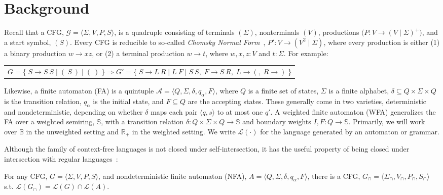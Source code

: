 \documentclass[popl.tex]{subfiles}
\begin{document}
\section{Background}

Recall that a CFG, $\mathcal{G} = \langle \Sigma, V, P, S\rangle$, is a quadruple consisting of terminals $(\Sigma)$, nonterminals $(V)$, productions $\big(P\colon V \rightarrow (V \mid \Sigma)^+\big)$, and a start symbol, $(S)$. Every CFG is reducible to so-called \textit{Chomsky Normal Form}~\cite{chomsky1959certain}, $P'\colon V \rightarrow (V^2 \mid \Sigma)$, where every production is either (1) a binary production $w \rightarrow xz$, or (2) a terminal production $w \rightarrow t$, where $w, x, z: V$ and $t: \Sigma$. For example:\vspace{-3pt}

\begin{table}[H]
  \centering
  \begin{tabular}{l}
    $G = \big\{\;S \rightarrow S\:S \mid (\:S\:) \mid (\:)\;\big\} \Longrightarrow G' = \big\{\;S \rightarrow L\:R \mid L\:F \mid S\:S,\;F \rightarrow S\:R,\;L \rightarrow (,\;R \rightarrow )\;\big\}$
  \end{tabular}
\end{table}\vspace{-8pt}

Likewise, a finite automaton (FA) is a quintuple $\mathcal{A} = \langle Q, \Sigma, \delta, q_\alpha, F\rangle$, where $Q$ is a finite set of states, $\Sigma$ is a finite alphabet, $\delta \subseteq Q \times \Sigma \times Q$ is the transition relation, $q_\alpha$ is the initial state, and $F \subseteq Q$ are the accepting states. These generally come in two varieties, deterministic and nondeterministic, depending on whether $\delta$ maps each pair $\langle q, s \rangle$ to at most one $q'$. A weighted finite automaton (WFA) generalizes the FA over a weighted semiring, \(\mathbb{S}\), with a transition relation \(\delta \colon Q \times \Sigma \times Q \to \mathbb{S}\) and boundary weights \(I, F \colon Q \to \mathbb{S}\). Primarily, we will work over $\mathbb{B}$ in the unweighted setting and $\mathbb{R}_+$ in the weighted setting. We write $\mathcal{L}(\cdot)$ for the language generated by an automaton or grammar.

Although the family of context-free languages is not closed under self-intersection, it has the useful property of being closed under intersection with regular languages~\cite{bar1961formal}:

\begin{theorem}
  For any CFG, $G = \langle \Sigma, V, P, S\rangle$, and nondeterministic finite automaton (NFA), $A = \langle Q, \Sigma, \delta, q_\alpha, F\rangle$, there is a CFG, \(G_\cap=\langle \Sigma_\cap,  V_\cap,P_\cap, S_\cap\rangle\) s.t. $\mathcal{L}(G_\cap) = \mathcal{L}(G)\cap\mathcal{L}(A)$.
\end{theorem}
\end{document}
